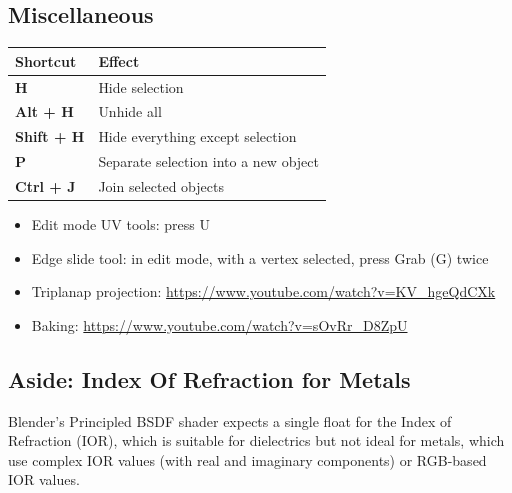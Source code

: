 \documentclass{article}
\begin{document}
\subsection{Miscellaneous}

\begin{longtable}{ll}
    \toprule
    \textbf{Shortcut}  & \textbf{Effect}                      \\
    \midrule
    \endhead
    \bottomrule
    \endfoot

    \textbf{H}         & Hide selection                       \\
    \textbf{Alt + H}   & Unhide all                           \\
    \textbf{Shift + H} & Hide everything except selection     \\
    \textbf{P}         & Separate selection into a new object \\
    \textbf{Ctrl + J}  & Join selected objects                \\
\end{longtable}

\begin{itemize}[topsep=0pt, noitemsep]
    \item Edit mode UV tools: press U
    \item Edge slide tool: in edit mode, with a vertex selected, press Grab (G) twice
    \item Triplanap projection: \href{https://www.youtube.com/watch?v=KV_hgeQdCXk}{https://www.youtube.com/watch?v=KV\_hgeQdCXk}
    \item Baking: \href{https://www.youtube.com/watch?v=sOvRr_D8ZpU}{https://www.youtube.com/watch?v=sOvRr\_D8ZpU}
\end{itemize}

\subsection{Aside: Index Of Refraction for Metals}
Blender's Principled BSDF shader expects a single float for the Index of Refraction (IOR), which is suitable 
for dielectrics but not ideal for metals, which use complex IOR values (with real and imaginary components) or RGB-based IOR values.\par
\end{document}
